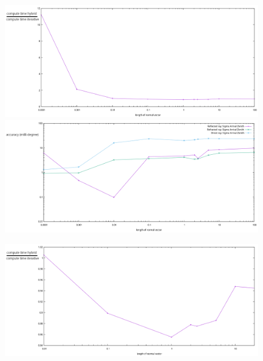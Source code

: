 \documentclass{beamer}
\begin{document}
\begin{frame}
	\begin{figure}
		\begin{minipage}{\textwidth}
			\centering
			\includegraphics[height=0.45\textheight]{figures/NormVsTime.pdf}
		\end{minipage}
		\begin{minipage}{\textwidth}
			\centering
			\includegraphics[height=0.45\textheight]{figures/NormVsSigmaAZ.pdf}
		\end{minipage}
	\end{figure}
\end{frame}
\begin{frame}
	\begin{figure}
		\includegraphics[width=\textwidth]{figures/NormVsTime2.pdf}
	\end{figure}
\end{frame}
\end{document}
